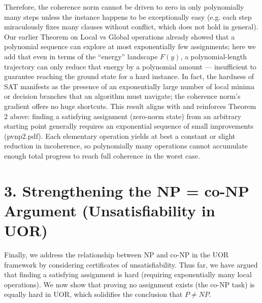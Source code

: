 \documentclass[11pt]{article}
\begin{document}
Therefore, the coherence norm cannot be driven to zero in only polynomially many steps unless the instance happens to be exceptionally easy (e.g. each step miraculously fixes many clauses without conflict, which does not hold in general). Our earlier Theorem on Local vs Global operations already showed that a polynomial sequence can explore at most exponentially few assignments; here we add that even in terms of the “energy” landscape \(F(y)\), a polynomial-length trajectory can only reduce that energy by a polynomial amount --- insufficient to guarantee reaching the ground state for a hard instance. In fact, the hardness of SAT manifests as the presence of an exponentially large number of local minima or decision branches that an algorithm must navigate; the coherence norm’s gradient offers no huge shortcuts. This result aligns with and reinforces Theorem 2 above: finding a satisfying assignment (zero-norm state) from an arbitrary starting point generally requires an exponential sequence of small improvements (pvnp2.pdf). Each elementary operation yields at best a constant or slight reduction in incoherence, so polynomially many operations cannot accumulate enough total progress to reach full coherence in the worst case.

\vspace{1em}

\section*{3. Strengthening the NP = co-NP Argument (Unsatisfiability in UOR)}

Finally, we address the relationship between NP and co-NP in the UOR framework by considering certificates of unsatisfiability. Thus far, we have argued that finding a satisfying assignment is hard (requiring exponentially many local operations). We now show that proving no assignment exists (the co-NP task) is equally hard in UOR, which solidifies the conclusion that \(P \neq NP\).
\end{document}

